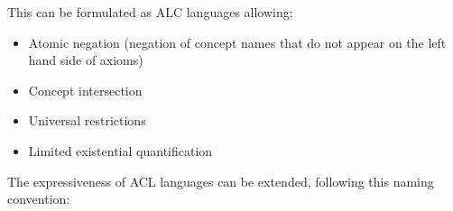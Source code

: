 
This can be formulated as ALC languages allowing:
\begin{itemize}
    \item Atomic negation (negation of concept names that do not appear on the left hand side of axioms)
    \item Concept intersection
    \item Universal restrictions
    \item Limited existential quantification
\end{itemize}

The expressiveness of ACL languages can be extended, following this naming convention:

